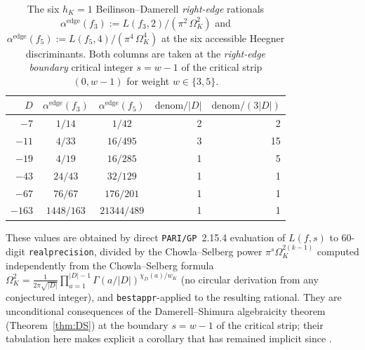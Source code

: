 \documentclass[11pt,a4paper]{amsart}
\theoremstyle{plain}
\theoremstyle{definition}
\newcommand{\alphaedge}{\alpha^{\mathrm{edge}}}
\newcommand{\eqdef}{:=}
\begin{document}
\begin{table}[h]
\centering
\caption{The six $h_K=1$ Beilinson--Damerell \emph{right-edge}
rationals
$\alphaedge(f_3)\eqdef L(f_3,2)/(\pi^{2}\,\Omega_K^{2})$ and
$\alphaedge(f_5)\eqdef L(f_5,4)/(\pi^{4}\,\Omega_K^{4})$ at the six
accessible Heegner discriminants. Both columns are taken at the
\emph{right-edge boundary} critical integer $s=w-1$ of the critical strip
$(0,w-1)$ for weight $w\in\{3,5\}$.}
\label{tab:h1}
\begin{tabular}{rccrr}
\toprule
$D$ & $\alphaedge(f_3)$ & $\alphaedge(f_5)$
    & $\mathrm{denom}/|D|$ & $\mathrm{denom}/(3|D|)$\\
\midrule
$-7$   & $1/14$    & $1/42$       & 2 & 2 \\
$-11$  & $4/33$    & $16/495$     & 3 & 15 \\
$-19$  & $4/19$    & $16/285$     & 1 & 5 \\
$-43$  & $24/43$   & $32/129$     & 1 & 1 \\
$-67$  & $76/67$   & $176/201$    & 1 & 1 \\
$-163$ & $1448/163$& $21344/489$  & 1 & 1 \\
\bottomrule
\end{tabular}
\end{table}

These values are obtained by direct \texttt{PARI/GP}~2.15.4 evaluation
of $L(f,s)$ to 60-digit \texttt{realprecision}, divided by the
Chowla--Selberg power $\pi^{s}\Omega_K^{2(k-1)}$ computed independently
from the Chowla--Selberg formula
$\Omega_K^2=\frac{1}{2\pi\sqrt{|D|}}\prod_{a=1}^{|D|-1}\Gamma(a/|D|)^{\chi_D(a)/w_K}$
(no circular derivation from any conjectured integer), and
\texttt{bestappr}-applied to the resulting rational. They are
unconditional consequences of the Damerell--Shimura algebraicity
theorem (Theorem~\ref{thm:DS}) at the boundary $s=w-1$ of the critical
strip; their tabulation here makes explicit a corollary that has
remained implicit since \cite[\S6]{Shimura1976}.
\end{document}
